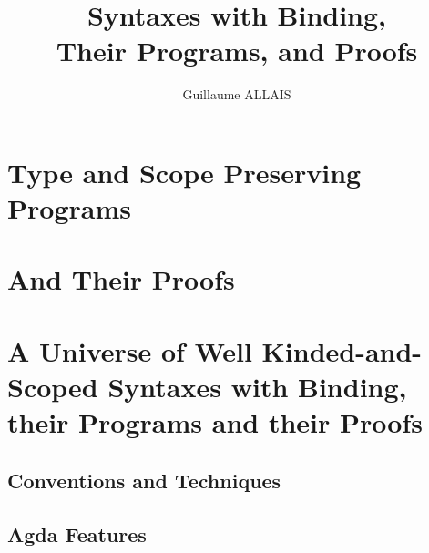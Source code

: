 \documentclass{memoir}
\title{\Huge Syntaxes with Binding, \\ Their Programs, and Proofs}
\author{\Large Guillaume ALLAIS}
\begin{document}
\frontmatter

\cleardoublepage{}

\maketitle{}

\mainmatter
\pagestyle{ruled}
\begin{KeepFromToc}
\tableofcontents
\end{KeepFromToc}


%




\part{Type and Scope Preserving Programs}
\label{type-scope-semantics}






\part{And Their Proofs}
\label{properties}





\part{A Universe of Well Kinded-and-Scoped Syntaxes with Binding, their Programs and their Proofs}
\label{a-universe}













\cleardoublepage{}


\appendix

\chapter{Conventions and Techniques}\label{sec:conventions}
\allconventions
\alltechniques

\chapter{Agda Features}\label{sec:features}
\allfeatures

\clearpage
\listoffigures

\end{document}
